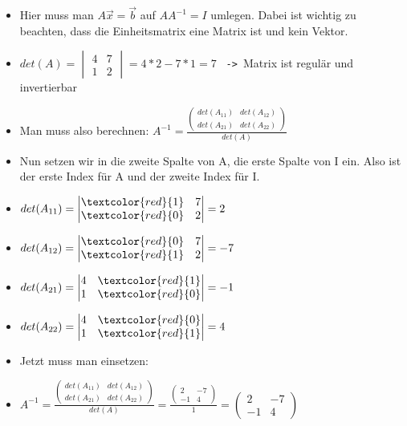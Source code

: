 \documentclass{article}
\begin{document}
\begin{itemize}
\begin{itemize}
\begin{itemize}
				\item{Hier muss man $A \vec{x}=\vec{b}$ auf $AA^{-1}=I$ umlegen. Dabei ist wichtig zu beachten, dass die Einheitsmatrix eine Matrix ist und kein Vektor.}
				\item{$det(A)=\begin{vmatrix} 4 & 7 \\ 1 & 2 \end{vmatrix}=4*2-7*1=7$ \texttt{ -> }Matrix ist regulär und invertierbar}
				\item{Man muss also berechnen: $A^{-1}=\frac{\begin{pmatrix} det(A_{11}) & det(A_{12}) \\ det(A_{21}) & det(A_{22}) \end{pmatrix}}{det(A)}$}
				\item{Nun setzen wir in die zweite Spalte von A, die erste Spalte von I ein. Also ist der erste Index für A und der zweite Index für I.}
				\item{$det(A_{11})=\begin{vmatrix} \textcolor{red}{1} & 7 \\ \textcolor{red}{0} & 2 \end{vmatrix}=2$}
				\item{$det(A_{12})=\begin{vmatrix} \textcolor{red}{0} & 7 \\ \textcolor{red}{1} & 2 \end{vmatrix}=-7$}
				\item{$det(A_{21})=\begin{vmatrix} 4 & \textcolor{red}{1} \\ 1 & \textcolor{red}{0} \end{vmatrix}=-1$}
				\item{$det(A_{22})=\begin{vmatrix} 4 & \textcolor{red}{0} \\ 1 & \textcolor{red}{1} \end{vmatrix}=4$}
				\item{Jetzt muss man einsetzen:}
				\item{$A^{-1}=\frac{\begin{pmatrix} det(A_{11}) & det(A_{12}) \\ det(A_{21}) & det(A_{22}) \end{pmatrix}}{det(A)}=\frac{\begin{pmatrix} 2 & -7 \\ -1 & 4 \end{pmatrix}}{1}=\begin{pmatrix} 2 & -7 \\ -1 & 4 \end{pmatrix}$}

\end{itemize}
\end{itemize}
\end{itemize}
\end{document}
